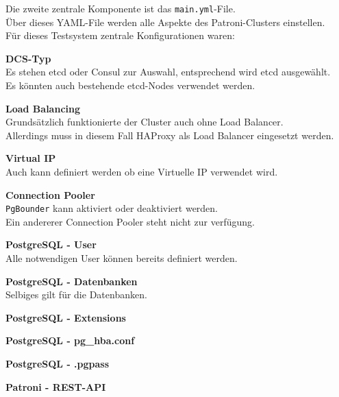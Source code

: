 \begin{flushleft}
    Die zweite zentrale Komponente ist das \texttt{main.yml}-File.\\
    Über dieses YAML-File werden alle Aspekte des Patroni-Clusters einstellen.\\
    Für dieses Testsystem zentrale Konfigurationen waren:
    \begin{description}
        \item \textbf{\Gls{DCS}-Typ}\hfill \\Es stehen \gls{etcd} oder \Gls{Consul} zur Auswahl, entsprechend wird \gls{etcd} ausgewählt.\\Es könnten auch bestehende \gls{etcd}-Nodes verwendet werden.
        \item \textbf{Load Balancing}\hfill \\Grundsätzlich funktionierte der Cluster auch ohne Load Balancer.\\Allerdings muss in diesem Fall \Gls{HAProxy} als Load Balancer eingesetzt werden.
        \item \textbf{Virtual IP}\hfill \\Auch kann definiert werden ob eine Virtuelle IP verwendet wird.
        \item \textbf{\Gls{Connection Pooler}}\hfill \\\texttt{PgBounder} kann aktiviert oder deaktiviert werden.\\Ein andererer \Gls{Connection Pooler} steht nicht zur verfügung.
        \item \textbf{PostgreSQL - User}\hfill \\Alle notwendigen User können bereits definiert werden.
        \item \textbf{PostgreSQL - Datenbanken}\hfill \\Selbiges gilt für die Datenbanken.\\
        \item \textbf{PostgreSQL - Extensions}\hfill \\
        \item \textbf{PostgreSQL - pg\_hba.conf}\hfill \\
        \item \textbf{PostgreSQL - .pgpass}\hfill \\
        \item \textbf{Patroni - REST-API}\hfill \\
    \end{description}
\end{flushleft}